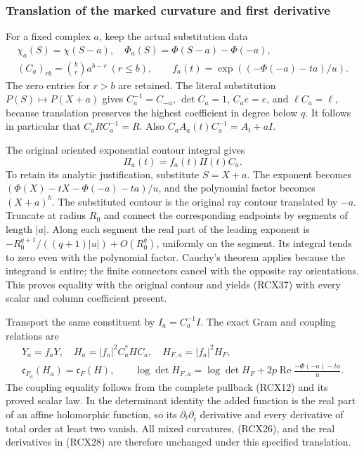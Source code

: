 \subsubsection{Translation of the marked curvature and first derivative}

For a fixed complex \(a\), keep the actual substitution data
\[
\begin{gathered}
 \chi_a(S)=\chi(S-a),\quad
 \Phi_a(S)=\Phi(S-a)-\Phi(-a),\\
 (C_a)_{rb}=\binom br a^{b-r}\ (r\le b),\qquad
 f_a(t)=\exp((-\Phi(-a)-ta)/u).
\end{gathered}\tag{RCX36}
\]
The zero entries for \(r>b\) are retained. The literal substitution
\(P(S)\mapsto P(X+a)\) gives
\(C_a^{-1}=C_{-a}\), \(\det C_a=1\), \(C_ae=e\), and
\(\ell C_a=\ell\), because translation preserves the highest
coefficient in degree below \(q\). It follows in particular that
\(C_aRC_a^{-1}=R\). Also
\(C_aA_a(t)C_a^{-1}=A_t+aI\).

The original oriented exponential contour integral gives
\[
 \Pi_a(t)=f_a(t)\Pi(t)C_a.
 \tag{RCX37}
\]
To retain its analytic justification, substitute \(S=X+a\).
The exponent becomes
\((\Phi(X)-tX-\Phi(-a)-ta)/u\), and the polynomial factor becomes
\((X+a)^b\). The substituted contour is the original ray contour
translated by \(-a\). Truncate at radius \(R_0\) and connect the
corresponding endpoints by segments of length \(|a|\). Along each
segment the real part of the leading exponent is
\(-R_0^{q+1}/((q+1)|u|)+O(R_0^q)\), uniformly on the segment.
Its integral tends to zero even with the polynomial factor.
Cauchy's theorem applies because the integrand is entire; the
finite connectors cancel with the opposite ray orientations.
This proves equality with the original contour and yields
(RCX37) with every scalar and column coefficient present.

Transport the same constituent by \(I_a=C_a^{-1}I\). The exact
Gram and coupling relations are
\[
\begin{gathered}
 Y_a=f_aY,\quad H_a=|f_a|^2C_a^*HC_a,\quad
 H_{F,a}=|f_a|^2H_F,\\
 \mathfrak c_{F_a}(H_a)=\mathfrak c_F(H),\qquad
 \log\det H_{F,a}
 =\log\det H_F+2p\operatorname{Re}\frac{-\Phi(-a)-ta}{u}.
\end{gathered}\tag{RCX38}
\]
The coupling equality follows from the complete pullback
(RCX12) and its proved scalar law. In the determinant identity
the added function is the real part of an affine holomorphic
function, so its \(\partial_t\partial_{\bar t}\) derivative and
every derivative of total order at least two vanish. All mixed
curvatures, (RCX26), and the real derivatives in (RCX28) are
therefore unchanged under this specified translation.

